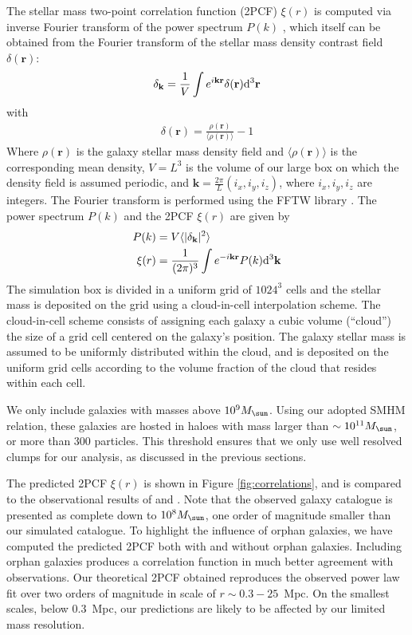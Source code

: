 The  stellar mass  two-point correlation  function (2PCF)  $\xi(r)$ is
computed via  inverse Fourier transform  of the power  spectrum $P(k)$
\citep[e.g.][]{Mo},  which itself  can  be obtained  from the  Fourier
transform    of   the    stellar   mass    density   contrast    field
$\delta(\mathbf{r})$:
%
\begin{align}
  \delta_\mathbf{k} = \frac{1}{V}\int e^{i\mathbf{kr}} \delta(\mathbf{r}) \mathrm{d} ^3 \mathbf{r}
\end{align}
%
with
%
\begin{align}
	\delta(\mathbf{r}) = \frac{\rho(\mathbf{r})}{\langle \rho(\mathbf{r}) \rangle } - 1
\end{align}
%
Where $\rho(\mathbf{r})$ is the galaxy  stellar mass density field and
$\langle \rho(\mathbf{r}) \rangle$ is  the corresponding mean density,
$V = L^3$ is the volume of our large box on which the density field is
assumed  periodic,  and  $\mathbf{k}=\frac{2\pi}{L}(i_x,  i_y,  i_z)$,
where  $i_x,  i_y,  i_z$  are  integers.   The  Fourier  transform  is
performed using  the FFTW library \citep{FFTW05}.   The power spectrum
$P(k)$ and the 2PCF $\xi(r)$ are given by
%
\begin{align}
  P(k)    &= V \langle |\delta_\mathbf{k}|^2 \rangle \\
  \xi(r)  &= \frac{1}{(2\pi)^3} \int e^{-i\mathbf{kr}} P(k) \mathrm{d}^3 \mathbf{k} 
\end{align}
The simulation box is divided in  a uniform grid of $1024^3$ cells and
the  stellar mass  is  deposited  on the  grid  using a  cloud-in-cell
interpolation scheme.  The cloud-in-cell scheme consists  of assigning
each  galaxy a  cubic  volume  (``cloud'') the  size  of  a grid  cell
centered on the galaxy's position.  The galaxy stellar mass is assumed
to be uniformly distributed within the  cloud, and is deposited on the
uniform grid cells according to the  volume fraction of the cloud that
resides within each cell.

We only  include galaxies with  masses above $10^9 \msol$.   Using our
adopted SMHM relation,  these galaxies are hosted in  haloes with mass
larger than  $\sim 10^{11} \msol$,  or more than 300  particles.  This
threshold  ensures that  we  only  use well  resolved  clumps for  our
analysis, as discussed in the previous sections.

The predicted 2PCF $\xi(r)$ is shown in Figure \ref{fig:correlations},
and is  compared to  the observational  results of  \cite{LiWhite} and
\cite{Correlation1}.   Note  that  the observed  galaxy  catalogue  is
presented as  complete down  to $10^8 \msol$,  one order  of magnitude
smaller than our  simulated catalogue.  To highlight  the influence of
orphan galaxies,  we have  computed the predicted  2PCF both  with and
without  orphan  galaxies.   Including   orphan  galaxies  produces  a
correlation function in much  better agreement with observations.  Our
theoretical 2PCF obtained  reproduces the observed power  law fit over
two orders  of magnitude  in scale  of $r\sim 0.3  - 25$~Mpc.   On the
smallest  scales, below  0.3~Mpc,  our predictions  are  likely to  be
affected by our limited mass resolution.

